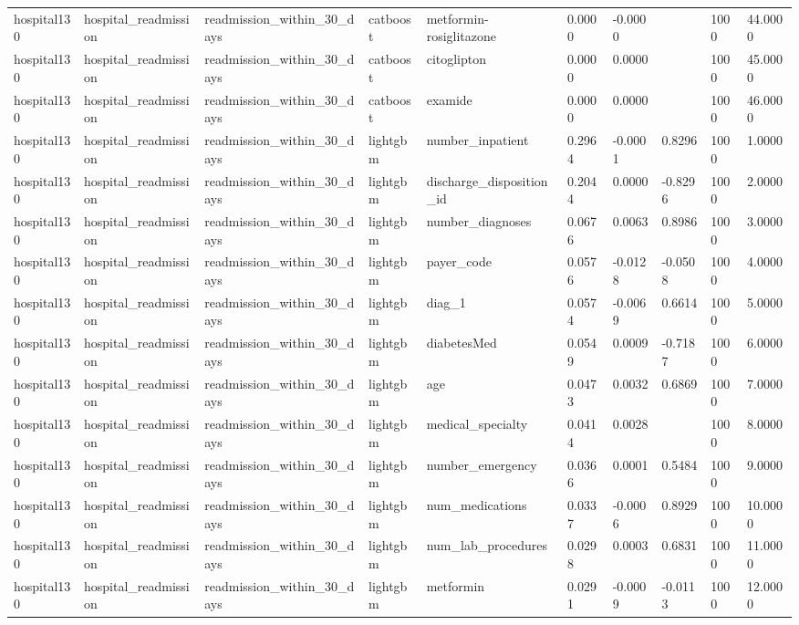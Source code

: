 \begin{tabular}{llllllllll}
hospital130 & hospital\_readmission & readmission\_within\_30\_days & catboost & metformin-rosiglitazone & 0.0000 & -0.0000 &  & 1000 & 44.0000 \\
hospital130 & hospital\_readmission & readmission\_within\_30\_days & catboost & citoglipton & 0.0000 & 0.0000 &  & 1000 & 45.0000 \\
hospital130 & hospital\_readmission & readmission\_within\_30\_days & catboost & examide & 0.0000 & 0.0000 &  & 1000 & 46.0000 \\
hospital130 & hospital\_readmission & readmission\_within\_30\_days & lightgbm & number\_inpatient & 0.2964 & -0.0001 & 0.8296 & 1000 & 1.0000 \\
hospital130 & hospital\_readmission & readmission\_within\_30\_days & lightgbm & discharge\_disposition\_id & 0.2044 & 0.0000 & -0.8296 & 1000 & 2.0000 \\
hospital130 & hospital\_readmission & readmission\_within\_30\_days & lightgbm & number\_diagnoses & 0.0676 & 0.0063 & 0.8986 & 1000 & 3.0000 \\
hospital130 & hospital\_readmission & readmission\_within\_30\_days & lightgbm & payer\_code & 0.0576 & -0.0128 & -0.0508 & 1000 & 4.0000 \\
hospital130 & hospital\_readmission & readmission\_within\_30\_days & lightgbm & diag\_1 & 0.0574 & -0.0069 & 0.6614 & 1000 & 5.0000 \\
hospital130 & hospital\_readmission & readmission\_within\_30\_days & lightgbm & diabetesMed & 0.0549 & 0.0009 & -0.7187 & 1000 & 6.0000 \\
hospital130 & hospital\_readmission & readmission\_within\_30\_days & lightgbm & age & 0.0473 & 0.0032 & 0.6869 & 1000 & 7.0000 \\
hospital130 & hospital\_readmission & readmission\_within\_30\_days & lightgbm & medical\_specialty & 0.0414 & 0.0028 &  & 1000 & 8.0000 \\
hospital130 & hospital\_readmission & readmission\_within\_30\_days & lightgbm & number\_emergency & 0.0366 & 0.0001 & 0.5484 & 1000 & 9.0000 \\
hospital130 & hospital\_readmission & readmission\_within\_30\_days & lightgbm & num\_medications & 0.0337 & -0.0006 & 0.8929 & 1000 & 10.0000 \\
hospital130 & hospital\_readmission & readmission\_within\_30\_days & lightgbm & num\_lab\_procedures & 0.0298 & 0.0003 & 0.6831 & 1000 & 11.0000 \\
hospital130 & hospital\_readmission & readmission\_within\_30\_days & lightgbm & metformin & 0.0291 & -0.0009 & -0.0113 & 1000 & 12.0000 \\

\end{tabular}
